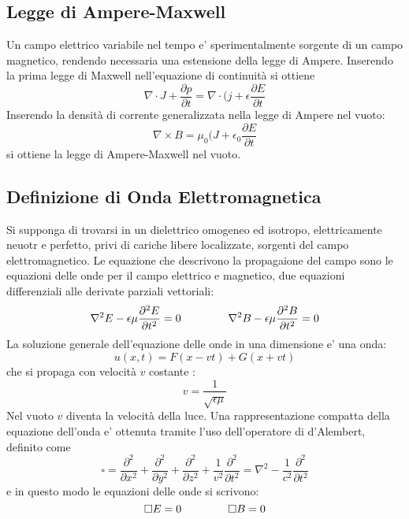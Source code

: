 \documentclass[a4paper, 10pt]{article}
\begin{document}
		\subsection{Legge di Ampere-Maxwell}
			Un campo elettrico variabile nel tempo e' sperimentalmente sorgente di un campo magnetico, rendendo necessaria una
			 estensione della legge di Ampere. Inserendo la prima legge di Maxwell nell'equazione di continuità si ottiene
			\[ \nabla \cdot J + \frac{\partial p}{\partial t} = \nabla \cdot ( j + \epsilon \frac{\partial E}{\partial t} \]
			Inserendo la densità di corrente generalizzata nella legge di Ampere nel vuoto:
			\[ \nabla \times B = \mu_0 (J + \epsilon_0 \frac{\partial E}{\partial t} \]
			si ottiene la legge di Ampere-Maxwell nel vuoto.

		\subsection{Definizione di Onda Elettromagnetica}
			Si supponga di trovarsi in un dielettrico omogeneo ed isotropo, elettricamente neuotr e perfetto, privi di cariche 
			libere localizzate, sorgenti del campo elettromagnetico. Le equazione che descrivono la propagaione del campo
			sono le equazioni delle onde per il campo elettrico e magnetico, due equazioni differenziali alle derivate 
			parziali vettoriali:
			\[ \nabla^2 E - \epsilon \mu \frac{\partial^2 E}{\partial t^2} = 0 \hspace{1.5cm} 
			\nabla^2 B - \epsilon \mu \frac{\partial^2 B}{\partial t^2} = 0 \]
			La soluzione generale dell'equazione delle onde in una dimensione e' una onda:
			\[ u(x,t) = F(x - vt) + G(x + vt) \] che si propaga con velocità $v$ costante :
			\[ v = \frac{1}{\sqrt{\epsilon \mu}} \] Nel vuoto $v$ diventa la velocità della luce.
			Una rappresentazione compatta della equazione dell'onda e' ottenuta tramite l'uso dell'operatore di d'Alembert, definito
			come 
			\[ \square = \frac{\partial^2}{\partial x^2} + \frac{\partial^2}{\partial y^2} + \frac{\partial^2}{\partial z^2}  
			+ \frac{1}{v^2} \frac{\partial^2}{\partial t^2} = \nabla^2 - \frac{1}{c^2}\frac{\partial^2}{\partial t^2}\]
			e in questo modo le equazioni delle onde si scrivono:
			\[ \square E = 0 \hspace{1.5cm} \square B = 0 \]
\end{document}
